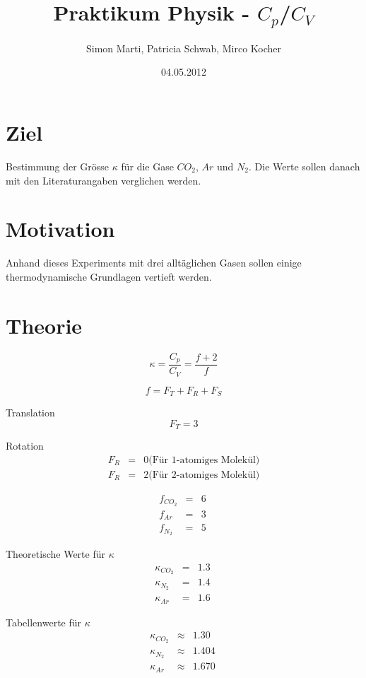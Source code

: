 \documentclass[12pt,a4paper]{article}
\title{Praktikum Physik - $C_p$/$C_V$}
\author{Simon Marti, Patricia Schwab, Mirco Kocher}
\date{04.05.2012}
\begin{document}
\maketitle

\section*{Ziel}
Bestimmung der Gr\"osse $\kappa$ f\"ur die Gase $CO_2$, $Ar$ und $N_2$. Die Werte sollen danach mit den Literaturangaben verglichen werden.


\section*{Motivation}
Anhand dieses Experiments mit drei allt\"aglichen Gasen sollen einige thermodynamische Grundlagen vertieft werden.


\section*{Theorie}
\begin{equation}
\kappa = \frac{C_p}{C_V} = \frac{f+2}{f}
\end{equation}

\begin{equation}
f = F_T + F_R + F_S
\end{equation}

Translation
\begin{equation}
F_T = 3
\end{equation}

Rotation
\begin{eqnarray}
F_R & = & 0 \mbox{(F\"ur 1-atomiges Molek\"ul)} \\
F_R & = & 2 \mbox{(F\"ur 2-atomiges Molek\"ul)}
\end{eqnarray}

\begin{eqnarray}
f_{CO_2} & = & 6 \\
f_{Ar} & = & 3 \\
f_{N_2} & = & 5 \
\end{eqnarray}

Theoretische Werte f\"ur $\kappa $
\begin{eqnarray}
\kappa_{CO_2} & = & 1.3 \\
\kappa_{N_2} & = & 1.4 \\
\kappa_{Ar} & = & 1.6 \
\end{eqnarray}

Tabellenwerte f\"ur $\kappa $
\begin{eqnarray}
\kappa_{CO_2} & \approx & 1.30 \\
\kappa_{N_2} & \approx & 1.404 \\
\kappa_{Ar} & \approx & 1.670 \
\end{eqnarray}
\end{document}
